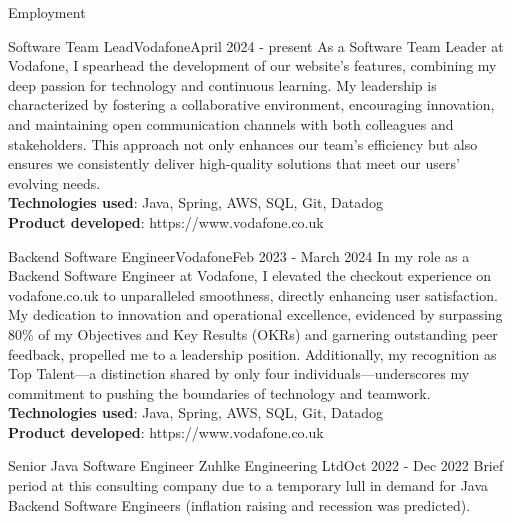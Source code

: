 \documentclass[]{mcdowellcv}
\begin{document}
  \begin{cvsection}{Employment}

		\begin{cvsubsection}{Software Team Lead}{Vodafone}{April 2024 - present}
			\hspace{\parindent} \hspace{\parindent} \hspace{\parindent} \hspace{\parindent} 
			As a Software Team Leader at Vodafone, I spearhead the development of our website's features, combining my deep passion for technology and continuous learning. 
			My leadership is characterized by fostering a collaborative environment, encouraging innovation, and maintaining open communication channels with both colleagues and stakeholders. 
			This approach not only enhances our team's efficiency but also ensures we consistently deliver high-quality solutions that meet our users' evolving needs.
			\\ \textbf{Technologies used}: Java, Spring, AWS, SQL, Git, Datadog
			\\ \textbf{Product developed}: https://www.vodafone.co.uk
		\end{cvsubsection}

		\begin{cvsubsection}{Backend Software Engineer}{Vodafone}{Feb 2023 - March 2024}
			\hspace{\parindent} \hspace{\parindent} \hspace{\parindent} \hspace{\parindent} 
			    In my role as a Backend Software Engineer at Vodafone, I elevated the checkout experience on vodafone.co.uk to unparalleled smoothness, directly enhancing user satisfaction. My dedication to innovation and operational excellence, evidenced by surpassing 80\% of my Objectives and Key Results (OKRs) and garnering outstanding peer feedback, propelled me to a leadership position. Additionally, my recognition as Top Talent—a distinction shared by only four individuals—underscores my commitment to pushing the boundaries of technology and teamwork.
			\\ \textbf{Technologies used}: Java, Spring, AWS, SQL, Git, Datadog
			\\ \textbf{Product developed}: https://www.vodafone.co.uk
		\end{cvsubsection}

		\begin{cvsubsection}{Senior Java Software Engineer }{Zuhlke Engineering Ltd}{Oct 2022 - Dec 2022}
			\hspace{\parindent} \hspace{\parindent} \hspace{\parindent} \hspace{\parindent} Brief period at this consulting company due to a temporary lull in demand for Java Backend Software Engineers (inflation raising and recession was predicted). 
		\end{cvsubsection}


\end{cvsection}
\end{document}
